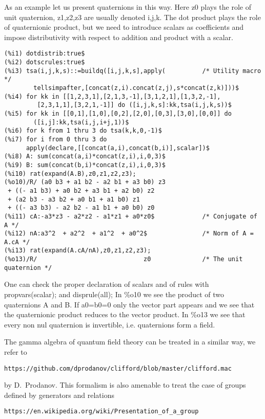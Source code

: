 \documentclass[a4paper,11pt]{article}
\begin{document}
As an example let us present quaternions in this way. Here z0 plays
the role of unit quaternion, z1,z2,z3 are usually denoted i,j,k. The
dot product plays the role of quaternionic product, but we need to
introduce scalars as coefficients and impose distributivity with
respect to addition and product with a scalar.
\newpage
\begin{verbatim}
(%i1) dotdistrib:true$
(%i2) dotscrules:true$
(%i3) tsa(i,j,k,s)::=buildq([i,j,k,s],apply(          /* Utility macro */
        tellsimpafter,[concat(z,i).concat(z,j),s*concat(z,k)]))$
(%i4) for kk in [[1,2,3,1],[2,1,3,-1],[3,1,2,1],[1,3,2,-1],
         [2,3,1,1],[3,2,1,-1]] do ([i,j,k,s]:kk,tsa(i,j,k,s))$
(%i5) for kk in [[0,1],[1,0],[0,2],[2,0],[0,3],[3,0],[0,0]] do
        ([i,j]:kk,tsa(i,j,i+j,1))$
(%i6) for k from 1 thru 3 do tsa(k,k,0,-1)$
(%i7) for i from 0 thru 3 do
      apply(declare,[[concat(a,i),concat(b,i)],scalar])$
(%i8) A: sum(concat(a,i)*concat(z,i),i,0,3)$
(%i9) B: sum(concat(b,i)*concat(z,i),i,0,3)$
(%i10) rat(expand(A.B),z0,z1,z2,z3);
(%o10)/R/ (a0 b3 + a1 b2 - a2 b1 + a3 b0) z3
 + ((- a1 b3) + a0 b2 + a3 b1 + a2 b0) z2 
 + (a2 b3 - a3 b2 + a0 b1 + a1 b0) z1
 + ((- a3 b3) - a2 b2 - a1 b1 + a0 b0) z0
(%i11) cA:-a3*z3 - a2*z2 - a1*z1 + a0*z0$             /* Conjugate of A */
(%i12) nA:a3^2  + a2^2  + a1^2  + a0^2$               /* Norm of A = A.cA */
(%i13) rat(expand(A.cA/nA),z0,z1,z2,z3);
(%o13)/R/                             z0              /* The unit quaternion */
\end{verbatim}
One can check the proper declaration of scalars and of rules with 
propvars(scalar);  and disprule(all);
In \%o10 we see the product of two quaternions A and B. If a0=b0=0 only the vector part
appears and we see that the quaternionic product reduces to the vector product.
In \%o13 we see that every non nul quaternion is invertible, i.e.
quaternions form a field. 

The gamma algebra of quantum field theory can be treated in a similar
way, we refer to
\begin{verbatim}
https://github.com/dprodanov/clifford/blob/master/clifford.mac
\end{verbatim}
by D.\ Prodanov.  This formalism is also amenable to treat the case of
groups defined by generators and relations
\begin{verbatim}
https://en.wikipedia.org/wiki/Presentation_of_a_group
\end{verbatim}
\end{document}
